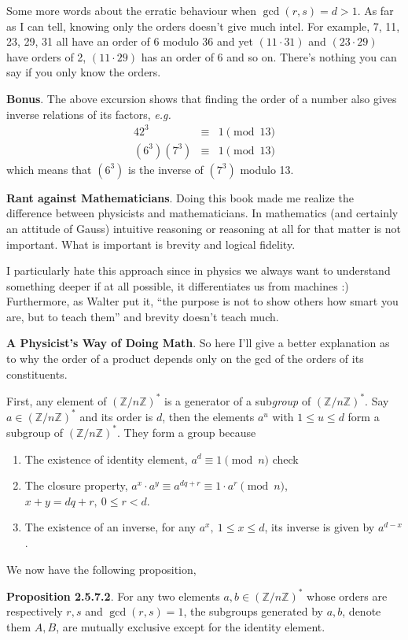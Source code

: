 \documentclass[aps,preprint,preprintnumbers,nofootinbib,showpacs,prd]{revtex4-1}
\newcommand{\eg}{{\it e.g.} }
\newcommand{\nbea}{\begin{eqnarray*}}
\newcommand{\neea}{\end{eqnarray*}}
\begin{document}
Some more words about the erratic behaviour when $\gcd(r,s) = d > 1$. As far as I can tell, knowing only the orders doesn't give much intel. For example, 7, 11, 23, 29, 31 all have an order of 6 modulo 36 and yet $(11 \cdot 31)$ and $(23 \cdot 29)$ have orders of 2, $(11 \cdot 29)$ has an order of 6 and so on. There's nothing you can say if you only know the orders.

{\bf Bonus}. The above excursion shows that finding the order of a number also gives inverse relations of its factors, \eg
%
\nbea
42^3 & \equiv & 1 \pmod{13} \\
(6^3) (7^3) & \equiv & 1 \pmod{13}
\neea
%
which means that $(6^3)$ is the inverse of $(7^3)$ modulo 13.

{\bf Rant against Mathematicians}. Doing this book made me realize the difference between physicists and mathematicians. In mathematics (and certainly an attitude of Gauss) intuitive reasoning or reasoning at all for that matter is not important. What is important is brevity and logical fidelity.

I particularly hate this approach since in physics we always want to understand something deeper if at all possible, it differentiates us from machines :) Furthermore, as Walter put it, ``the purpose is not to show others how smart you are, but to teach them'' and brevity doesn't teach much.

{\bf A Physicist's Way of Doing Math}. So here I'll give a better explanation as to why the order of a product depends only on the gcd of the orders of its constituents.

First, any element of $(\mathbb{Z}/n\mathbb{Z})^*$ is a generator of a sub{\it group} of $(\mathbb{Z}/n\mathbb{Z})^*$. Say $a \in (\mathbb{Z}/n\mathbb{Z})^*$ and its order is $d$, then the elements $a^u$ with $1 \le u \le d$ form a subgroup of $(\mathbb{Z}/n\mathbb{Z})^*$. They form a group because
%
\begin{enumerate}
\item The existence of identity element, $a^d \equiv 1 \pmod{n}$ check \checkmark
\item The closure property, $a^x \cdot a^y \equiv a^{dq + r} \equiv 1 \cdot a^r \pmod{n}$, $x+y = dq+r, ~0 \le r < d$.
\item The existence of an inverse, for any $a^x,~ 1 \le x \le d$, its inverse is given by $a^{d-x}$.
\end{enumerate}
%
We now have the following proposition,

{\bf Proposition 2.5.7.2}. For any two elements $a, b \in (\mathbb{Z}/n\mathbb{Z})^*$ whose orders are respectively $r,s$ and $\gcd(r,s) = 1$, the subgroups generated by $a, b$, denote them $A, B$, are mutually exclusive except for the identity element.
\end{document}
